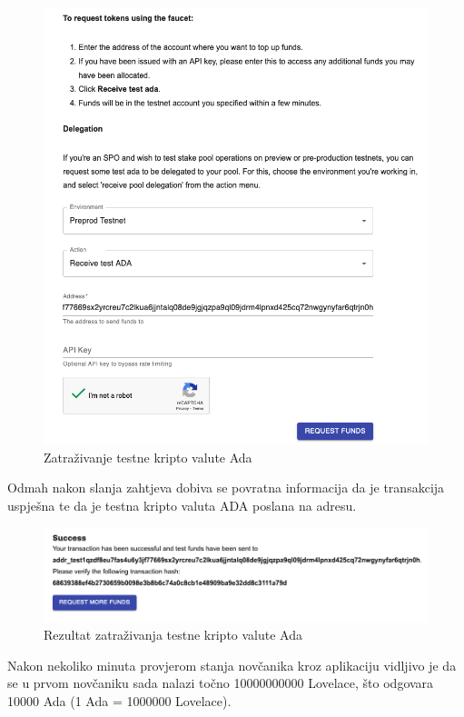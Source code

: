 \documentclass[times, utf8, diplomski]{fer}
\begin{document}
\begin{figure}[!htb]
\centering
\includegraphics[width=\linewidth]{img/faucet.png}
\caption{Zatraživanje testne kripto valute Ada}
\label{fig:faucet-request}
\end{figure}

Odmah nakon slanja zahtjeva dobiva se povratna informacija da je transakcija uspješna te da je testna kripto valuta ADA poslana na adresu.

\begin{figure}[!htb]
\centering
\includegraphics[width=\linewidth]{img/faucet-success.png}
\caption{Rezultat zatraživanja testne kripto valute Ada}
\label{fig:faucet-success}
\end{figure}

Nakon nekoliko minuta provjerom stanja novčanika kroz aplikaciju vidljivo je da se u prvom novčaniku sada nalazi točno 10000000000 Lovelace, što odgovara 10000 Ada (1 Ada = 1000000 Lovelace).
\end{document}
